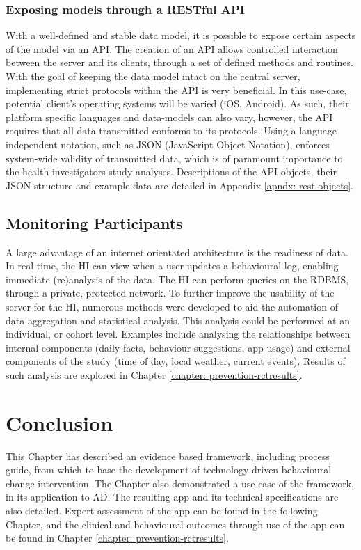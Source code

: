 \subsubsection{Exposing models through a RESTful API} \label{subsection-api}
With a well-defined and stable data model, it is possible to expose certain aspects of the model via an API. The creation of an API allows controlled interaction between the server and its clients, through a set of defined methods and routines. With the goal of keeping the data model intact on the central server, implementing strict protocols within the API is very beneficial. In this use-case, potential client's operating systems will be varied (iOS, Android). As such, their platform specific languages and data-models can also vary, however, the API requires that all data transmitted conforms to its protocols. Using a language independent notation, such as JSON (JavaScript Object Notation), enforces system-wide validity of transmitted data, which is of paramount importance to the health-investigators study analyses. Descriptions of the API objects, their JSON structure and example data are detailed in Appendix \ref{apndx: rest-objects}.

\subsection{Monitoring Participants}
A large advantage of an internet orientated architecture is the readiness of data. In real-time, the HI can view when a user updates a behavioural log, enabling immediate (re)analysis of the data. The HI can perform queries on the RDBMS, through a private, protected network. To further improve the usability of the server for the HI, numerous methods were developed to aid the automation of data aggregation and statistical analysis. This analysis could be performed at an individual, or cohort level.
Examples include analysing the relationships between internal components (daily facts, behaviour suggestions, app usage) and external components of the study (time of day, local weather, current events). Results of such analysis are explored in Chapter \ref{chapter: prevention-rctresults}.

\section{Conclusion}
This Chapter has described an evidence based framework, including process guide, from which to base the development of technology driven behavioural change intervention. The Chapter also demonstrated a use-case of the framework, in its application to AD. The resulting app and its technical specifications are also detailed. Expert assessment of the app can be found in the following Chapter, and the clinical and behavioural outcomes through use of the app can be found in Chapter \ref{chapter: prevention-rctresults}.
